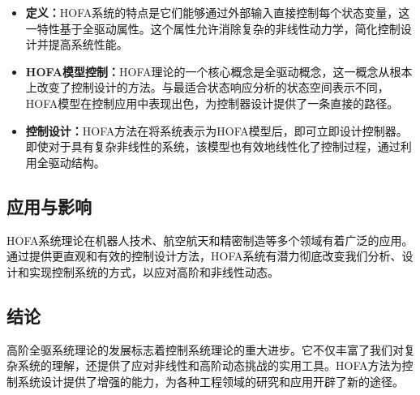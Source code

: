 \begin{itemize}
    \item \textbf{定义：}HOFA系统的特点是它们能够通过外部输入直接控制每个状态变量，这一特性基于全驱动属性。这个属性允许消除复杂的非线性动力学，简化控制设计并提高系统性能。
    
    \item \textbf{HOFA模型控制：}HOFA理论的一个核心概念是全驱动概念，这一概念从根本上改变了控制设计的方法。与最适合状态响应分析的状态空间表示不同，HOFA模型在控制应用中表现出色，为控制器设计提供了一条直接的路径。
    
    \item \textbf{控制设计：}HOFA方法在将系统表示为HOFA模型后，即可立即设计控制器。即使对于具有复杂非线性的系统，该模型也有效地线性化了控制过程，通过利用全驱动结构。
\end{itemize}

\subsection{应用与影响}

HOFA系统理论在机器人技术、航空航天和精密制造等多个领域有着广泛的应用。通过提供更直观和有效的控制设计方法，HOFA系统有潜力彻底改变我们分析、设计和实现控制系统的方式，以应对高阶和非线性动态。

\subsection{结论}

高阶全驱系统理论的发展标志着控制系统理论的重大进步。它不仅丰富了我们对复杂系统的理解，还提供了应对非线性和高阶动态挑战的实用工具。HOFA方法为控制系统设计提供了增强的能力，为各种工程领域的研究和应用开辟了新的途径。


